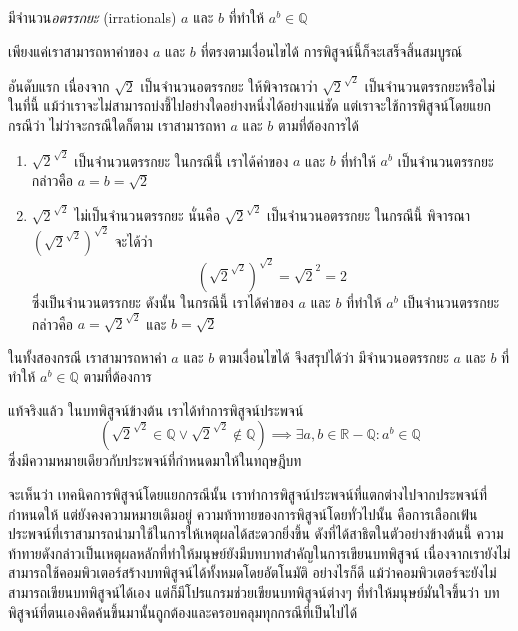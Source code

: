 \begin{theorem}
มีจำนวน\emph{อตรรกยะ} (irrationals) $a$ และ $b$ ที่ทำให้ $a^b\in\mathbb{Q}$

\begin{pf}
เพียงแค่เราสามารถหาค่าของ $a$ และ $b$ ที่ตรงตามเงื่อนไขได้ การพิสูจน์นี้ก็จะเสร็จสิ้นสมบูรณ์

อันดับแรก เนื่องจาก $\sqrt{2}$ เป็นจำนวนอตรรกยะ ให้พิจารณาว่า $\sqrt{2}^{\sqrt{2}}$ เป็นจำนวนตรรกยะหรือไม่ ในที่นี้ แม้ว่าเราจะไม่สามารถบ่งชี้ไปอย่างใดอย่างหนึ่งได้อย่างแน่ชัด แต่เราจะใช้การพิสูจน์โดยแยกกรณีว่า ไม่ว่าจะกรณีใดก็ตาม เราสามารถหา $a$ และ $b$ ตามที่ต้องการได้
\begin{enumerate}
\item $\sqrt{2}^{\sqrt{2}}$ เป็นจำนวนตรรกยะ ในกรณีนี้ เราได้ค่าของ $a$ และ $b$ ที่ทำให้ $a^b$ เป็นจำนวนตรรกยะ กล่าวคือ $a=b=\sqrt{2}$
\item $\sqrt{2}^{\sqrt{2}}$ ไม่เป็นจำนวนตรรกยะ นั่นคือ $\sqrt{2}^{\sqrt{2}}$ เป็นจำนวนอตรรกยะ ในกรณีนี้ พิจารณา $\left(\sqrt{2}^{\sqrt{2}}\right)^{\sqrt{2}}$ จะได้ว่า \[\left(\sqrt{2}^{\sqrt{2}}\right)^{\sqrt{2}}=\sqrt{2}^2=2\] ซึ่งเป็นจำนวนตรรกยะ ดังนั้น ในกรณีนี้ เราได้ค่าของ $a$ และ $b$ ที่ทำให้ $a^b$ เป็นจำนวนตรรกยะ กล่าวคือ $a=\sqrt{2}^{\sqrt{2}}$ และ $b=\sqrt{2}$
\end{enumerate}
ในทั้งสองกรณี เราสามารถหาค่า $a$ และ $b$ ตามเงื่อนไขได้ จึงสรุปได้ว่า มีจำนวนอตรรกยะ $a$ และ $b$ ที่ทำให้ $a^b\in\mathbb{Q}$ ตามที่ต้องการ
\end{pf}
แท้จริงแล้ว ในบทพิสูจน์ข้างต้น เราได้ทำการพิสูจน์ประพจน์
\[(\sqrt{2}^{\sqrt{2}}\in\mathbb{Q}\vee\sqrt{2}^{\sqrt{2}}\notin\mathbb{Q})\implies\exists a,b\in\mathbb{R}-\mathbb{Q}: a^b\in\mathbb{Q}\]
ซึ่งมีความหมายเดียวกับประพจน์ที่กำหนดมาให้ในทฤษฎีบท
\end{theorem}
จะเห็นว่า เทคนิคการพิสูจน์โดยแยกกรณีนั้น เราทำการพิสูจน์ประพจน์ที่แตกต่างไปจากประพจน์ที่กำหนดให้ แต่ยังคงความหมายเดิมอยู่ \enskip ความท้าทายของการพิสูจน์โดยทั่วไปนั้น คือการเลือกเฟ้นประพจน์ที่เราสามารถนำมาใช้ในการให้เหตุผลได้สะดวกยิ่งขึ้น ดังที่ได้สาธิตในตัวอย่างข้างต้นนี้ \enskip ความท้าทายดังกล่าวเป็นเหตุผลหลักที่ทำให้มนุษย์ยังมีบทบาทสำคัญในการเขียนบทพิสูจน์ เนื่องจากเรายังไม่สามารถใช้คอมพิวเตอร์สร้างบทพิสูจน์ได้ทั้งหมดโดยอัตโนมัติ \enskip อย่างไรก็ดี แม้ว่าคอมพิวเตอร์จะยังไม่สามารถเขียนบทพิสูจน์ได้เอง แต่ก็มีโปรแกรมช่วยเขียนบทพิสูจน์ต่างๆ ที่ทำให้มนุษย์มั่นใจขึ้นว่า บทพิสูจน์ที่ตนเองคิดค้นขึ้นมานั้นถูกต้องและครอบคลุมทุกกรณีที่เป็นไปได้
